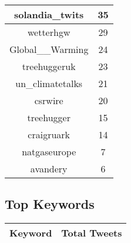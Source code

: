 \documentclass{article}\usepackage[T1]{fontenc}
\begin{document}
\begin{tabular}{|c|c|}
 \hline
solandia\_twits & 35\\ 
 \hline
wetterhgw & 29\\ 
 \hline
Global\_\_Warming & 24\\ 
 \hline
treehuggeruk & 23\\ 
 \hline
un\_climatetalks & 21\\ 
 \hline
csrwire & 20\\ 
 \hline
treehugger & 15\\ 
 \hline
craigruark & 14\\ 
 \hline
natgaseurope & 7\\ 
 \hline
avandery & 6\\ 
 \hline
\end{tabular}\subsection*{Top Keywords}\begin{tabular}{|c|c|}         \hline         Keyword & Total Tweets \\ 
 \hline
\end{tabular}
\end{document}
